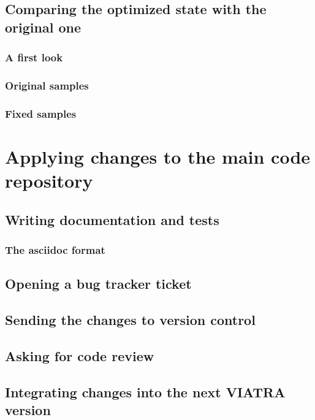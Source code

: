 \documentclass[11pt,a4paper,oneside]{report}
\begin{document}
\section{Comparing the optimized state with the original one}
\subsection{A first look}
\subsection{Original samples}
\subsection{Fixed samples}

\chapter{Applying changes to the main code repository}
\section{Writing documentation and tests}
\subsection{The asciidoc format}
\section{Opening a bug tracker ticket}
\section{Sending the changes to version control}
\section{Asking for code review}
\section{Integrating changes into the next VIATRA version}


\listoffigures{}

\nocite{*} %


\label{page:last}
\end{document}
